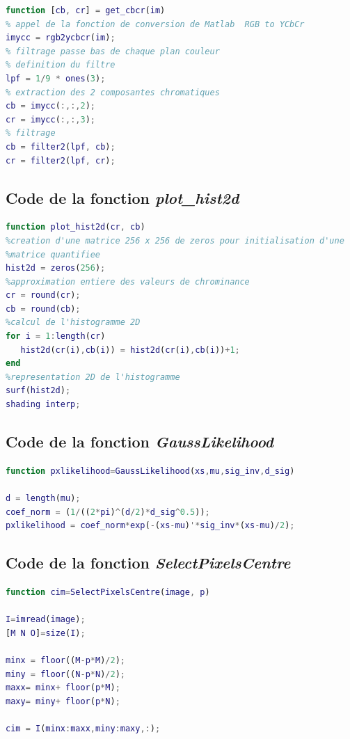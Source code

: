 \documentclass[11pt,a4paper]{article}
\begin{document}
\begin{lstlisting}[language=matlab]
function [cb, cr] = get_cbcr(im)
% appel de la fonction de conversion de Matlab  RGB to YCbCr
imycc = rgb2ycbcr(im);
% filtrage passe bas de chaque plan couleur 
% definition du filtre
lpf = 1/9 * ones(3);
% extraction des 2 composantes chromatiques 
cb = imycc(:,:,2);
cr = imycc(:,:,3);
% filtrage 
cb = filter2(lpf, cb);
cr = filter2(lpf, cr);
\end{lstlisting}

\subsection{Code de la fonction \emph{plot\_hist2d}}

\begin{lstlisting}[language=matlab]
function plot_hist2d(cr, cb)
%creation d'une matrice 256 x 256 de zeros pour initialisation d'une
%matrice quantifiee 
hist2d = zeros(256);
%approximation entiere des valeurs de chrominance
cr = round(cr);
cb = round(cb);
%calcul de l'histogramme 2D
for i = 1:length(cr)
   hist2d(cr(i),cb(i)) = hist2d(cr(i),cb(i))+1;
end
%representation 2D de l'histogramme
surf(hist2d);
shading interp;
\end{lstlisting}

\subsection{Code de la fonction \emph{GaussLikelihood}}

\begin{lstlisting}[language=matlab]
function pxlikelihood=GaussLikelihood(xs,mu,sig_inv,d_sig)

d = length(mu);
coef_norm = (1/((2*pi)^(d/2)*d_sig^0.5));
pxlikelihood = coef_norm*exp(-(xs-mu)'*sig_inv*(xs-mu)/2);
\end{lstlisting}

\subsection{Code de la fonction \emph{SelectPixelsCentre}}

\begin{lstlisting}[language=matlab]
function cim=SelectPixelsCentre(image, p)

I=imread(image);
[M N O]=size(I);

minx = floor((M-p*M)/2);
miny = floor((N-p*N)/2);
maxx= minx+ floor(p*M);
maxy= miny+ floor(p*N);

cim = I(minx:maxx,miny:maxy,:);
\end{lstlisting}
\end{document}
